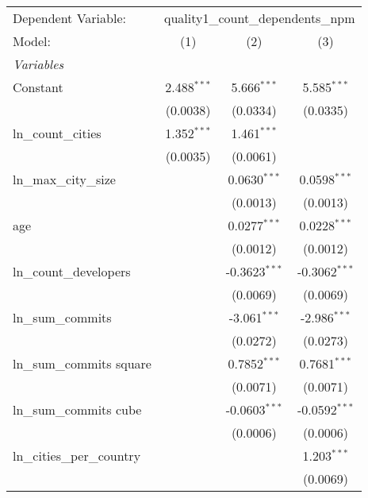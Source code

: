 
\begingroup
\centering
\begin{tabular}{lccc}
   \tabularnewline \midrule \midrule
   Dependent Variable: & \multicolumn{3}{c}{quality1\_count\_dependents\_npm}\\
   Model:                      & (1)           & (2)             & (3)\\  
   \midrule
   \emph{Variables}\\
   Constant                    & 2.488$^{***}$ & 5.666$^{***}$   & 5.585$^{***}$\\   
                               & (0.0038)      & (0.0334)        & (0.0335)\\   
   ln\_count\_cities           & 1.352$^{***}$ & 1.461$^{***}$   &   \\   
                               & (0.0035)      & (0.0061)        &   \\   
   ln\_max\_city\_size         &               & 0.0630$^{***}$  & 0.0598$^{***}$\\   
                               &               & (0.0013)        & (0.0013)\\   
   age                         &               & 0.0277$^{***}$  & 0.0228$^{***}$\\   
                               &               & (0.0012)        & (0.0012)\\   
   ln\_count\_developers       &               & -0.3623$^{***}$ & -0.3062$^{***}$\\   
                               &               & (0.0069)        & (0.0069)\\   
   ln\_sum\_commits            &               & -3.061$^{***}$  & -2.986$^{***}$\\   
                               &               & (0.0272)        & (0.0273)\\   
   ln\_sum\_commits square     &               & 0.7852$^{***}$  & 0.7681$^{***}$\\   
                               &               & (0.0071)        & (0.0071)\\   
   ln\_sum\_commits cube       &               & -0.0603$^{***}$ & -0.0592$^{***}$\\   
                               &               & (0.0006)        & (0.0006)\\   
   ln\_cities\_per\_country    &               &                 & 1.203$^{***}$\\   
                               &               &                 & (0.0069)\\   

\end{tabular}
